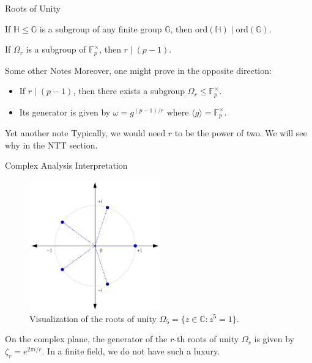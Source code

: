 \documentclass{zkdl-presentation-template}
\begin{document}
    \begin{frame}{Roots of Unity}
        \begin{theorem}
            If $\mathbb{H} \leq \mathbb{G}$ is a subgroup of any finite group $\mathbb{G}$, then $\text{ord}(\mathbb{H}) \mid \text{ord}(\mathbb{G})$.\pause
        \end{theorem}

        \begin{corollary}
            If $\Omega_r$ is a subgroup of $\mathbb{F}_p^{\times}$, then $r \mid
            (p - 1)$.\pause
        \end{corollary}

        \begin{alertblock}{Some other Notes}
            Moreover, one might prove in the opposite direction:
            \begin{itemize}
                \item If $r \mid (p-1)$, then there exists a subgroup $\Omega_r
                \leq \mathbb{F}_p^{\times}$.\pause
                \item Its generator is given by $\omega = g^{(p-1)/r}$ where 
                $\langle g \rangle = \mathbb{F}_p^{\times}$.\pause
            \end{itemize} 
        \end{alertblock}

        \begin{block}{Yet another note}
            Typically, we would need $r$ to be the power of two. We will see why 
            in the NTT section.
        \end{block}
    \end{frame}

    \begin{frame}{Complex Analysis Interpretation}
        \begin{figure}
            \centering
            \includegraphics[width=0.5\textwidth]{images/lecture_13/roots.png}
            \caption{Visualization of the roots of unity $\Omega_5 = \{z \in \mathbb{C}: z^5=1 \}$.}
        \end{figure}

        On the complex plane, the generator of the $r$-th roots of unity
        $\Omega_r$ is given by $\zeta_r = e^{2\pi i/r}$. In a finite field,
        we do not have such a luxury.
    \end{frame}
\end{document}
